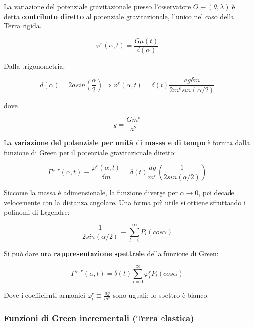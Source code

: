\documentclass[a4paper,12pt]{book}
\begin{document}
\noindent La variazione del potenziale gravitazionale presso l'osservatore $O \equiv (\theta, \lambda)$ è detta \textbf{contributo diretto} al potenziale gravitazionale, l'unico nel caso della Terra rigida.

\begin{equation}
    \varphi ^r (\alpha,t) = \frac{G \mu(t)}{d(\alpha)}
\end{equation}

\noindent Dalla trigonometria:

\begin{equation}
    d(\alpha) = 2a sin\left( \frac{\alpha}{2} \right) \Longrightarrow \varphi ^r (\alpha, t) = \delta(t) \frac{ag\delta m}{2m^e sin (\alpha/2)}
\end{equation}

\noindent
dove

\begin{equation}
    g = \frac{G m^e}{a^2}
\end{equation}

\noindent La \textbf{variazione del potenziale per unità di massa e di tempo} è fornita dalla funzione di Green per il potenziale gravitazionale diretto:

\begin{equation}
    \Gamma^{\varphi,r} (\alpha, t) \equiv \frac{\varphi^r (\alpha, t)}{\delta m} = \delta (t) \frac{ag}{m^e} \left( \frac{1}{2sin(\alpha/2)} \right)
\end{equation}

\noindent Siccome la massa è adimensionale, la funzione diverge per $\alpha \longrightarrow 0$, poi decade velocemente con la distanza angolare.
Una forma più utile si ottiene sfruttando i polinomi di Legendre:

\begin{equation}
    \frac{1}{2sin(\alpha/2)} \equiv \sum_{l=0}^\infty P_l (cos \alpha)
\end{equation}

\noindent Si può dare una \textbf{rappresentazione spettrale} della funzione di Green:

\begin{equation}
    \Gamma^{\varphi,r} (\alpha, t) = \delta (t) \sum_{l=0}^\infty \varphi _l^r P_l (cos \alpha)
\end{equation}

\noindent
Dove i coefficienti armonici $\varphi _l^r \equiv \frac{ag}{m^e}$ sono uguali: lo spettro è bianco.

\subsubsection{\textcolor{colore7}{Funzioni di Green incrementali (Terra elastica)}}
\end{document}
